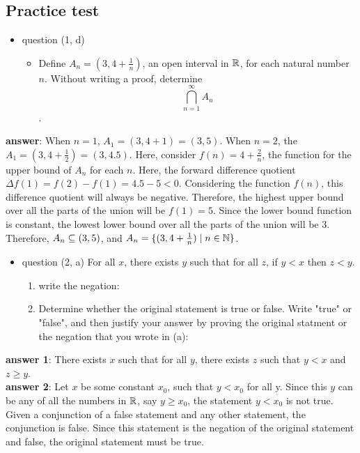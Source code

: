 \documentclass[12pt]{article}
\begin{document}
\subsection{Practice test}
\label{sec:orgbf97938}
\begin{itemize}
\item question (1, d)
\begin{itemize}
\item Define \(A_{n}=(3,4+\frac{1}{n})\), an open interval in \(\mathbb{R}\), for each natural
number \(n\). Without writing a proof, determine $$\bigcap\limits_{n=1}^{\infty}A_{n}$$.
\end{itemize}
\end{itemize}
\textbf{answer}: When \(n=1\), \(A_{1}=(3,4+1)=(3,5)\). When \(n=2\), the
\(A_{1}=(3,4+\frac{1}{2})=(3,4.5)\). Here, consider \(f(n)=4+\frac{2}{n}\), the
function for the upper bound of \(A_{n}\) for each \(n\). Here, the forward difference
quotient \(\Delta{}f(1)=f(2)-f(1)=4.5-5<0\). Considering the function \(f(n)\), this
difference quotient will always be negative. Therefore, the highest upper bound
over all the parts of the union will be \(f(1)=5\). Since the lower bound function
is constant, the lowest lower bound over all the parts of the union will be 3.
Therefore, \(A_{n}\subseteq{}(3,5)\), and \(A_{n}=\{(3,4+\frac{1}{n})\mid{}n\in{}\mathbb{N}\}\).

\begin{itemize}
\item question (2, a) For all \(x\), there exists \(y\) such that for all \(z\), if \(y<x\)
then \(z<y\).
\begin{enumerate}
\item write the negation:
\item Determine whether the original statement is true or false. Write "true" or
"false", and then justify your answer by proving the original statment or
the negation that you wrote in (a):
\end{enumerate}
\end{itemize}
\textbf{answer 1}: There exists \(x\) such that for all \(y\), there exists \(z\) such that
\(y<x\) and \(z\ge{}y\). \\
\textbf{answer 2}: Let \(x\) be some constant \(x_{0}\), such that \(y<x_{0}\) for all y. Since this
\(y\) can be any of all the numbers in \(\mathbb{R}\), say \(y\ge{}x_{0}\), the statement \(y<x_{0}\)
is not true. Given a conjunction of a false statement and any other statement,
the conjunction is false. Since this statement is the negation of the original
statement and false, the original statement must be true. \\
\end{document}
